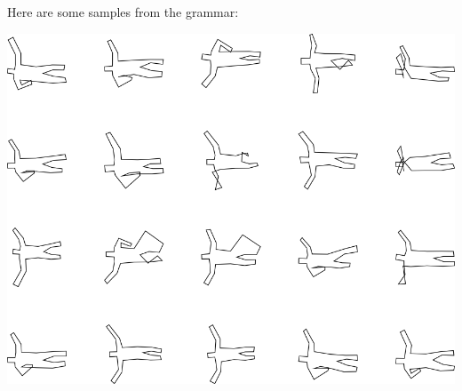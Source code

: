 Here are some samples from the grammar:

\includegraphics[width=6in]{output/3.learning/incremental/gram.27.d/samples.png}

